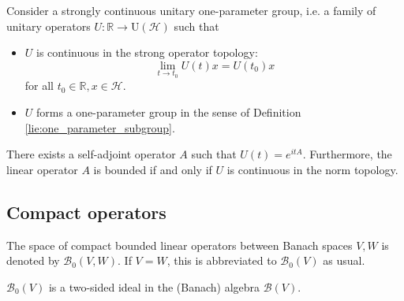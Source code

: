     \begin{theorem}[Stone]\label{functional:stone}
        Consider a strongly continuous unitary one-parameter group, i.e. a family of unitary operators $U:\mathbb{R}\rightarrow\mathrm{U}(\mathcal{H})$ such that
        \begin{itemize}
            \item $U$ is continuous in the strong operator topology: \[\lim_{t\rightarrow t_0}U(t)x=U(t_0)x\] for all $t_0\in\mathbb{R}, x\in\mathcal{H}$.
            \item $U$ forms a one-parameter group in the sense of Definition \ref{lie:one_parameter_subgroup}.
        \end{itemize}
        There exists a self-adjoint operator $A$ such that $U(t)=e^{itA}$. Furthermore, the linear operator $A$ is bounded if and only if $U$ is continuous in the norm topology.
    \end{theorem}

\subsection{Compact operators}



    \begin{notation}
        The space of compact bounded linear operators between Banach spaces $V,W$ is denoted by $\mathcal{B}_0(V,W)$. If $V=W$, this is abbreviated to $\mathcal{B}_0(V)$ as usual.
    \end{notation}
    \begin{property}
        $\mathcal{B}_0(V)$ is a two-sided ideal in the (Banach) algebra $\mathcal{B}(V)$.
    \end{property}

